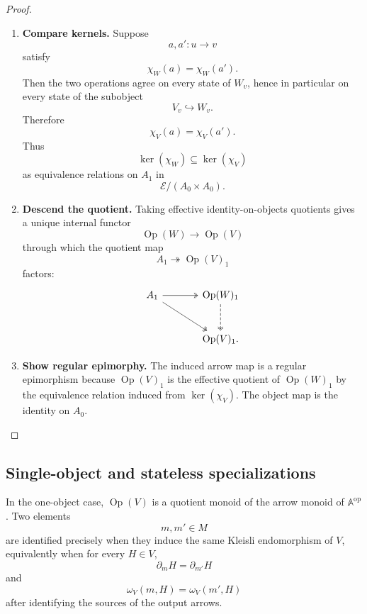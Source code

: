 \begin{proof}
    \leavevmode
    \begin{enumerate}
        \item \textbf{Compare kernels.}
        Suppose
        \[
            a,a':u\to v
        \]
        satisfy
        \[
            \chi_W(a)=\chi_W(a').
        \]
        Then the two operations agree on every state of \(W_v\), hence in
        particular on every state of the subobject
        \[
            V_v\hookrightarrow W_v.
        \]
        Therefore
        \[
            \chi_V(a)=\chi_V(a').
        \]
        Thus
        \[
            \ker(\chi_W)\subseteq \ker(\chi_V)
        \]
        as equivalence relations on \(A_1\) in
        \[
            \mathcal E/(A_0\times A_0).
        \]

        \item \textbf{Descend the quotient.}
        Taking effective identity-on-objects quotients gives a unique internal
        functor
        \[
            \operatorname{Op}(W)\to \operatorname{Op}(V)
        \]
        through which the quotient map
        \[
            A_1\twoheadrightarrow \operatorname{Op}(V)_1
        \]
        factors:
        \[
        \begin{tikzcd}[column sep=large, row sep=large]
            A_1
                \arrow[r, two heads]
                \arrow[dr, two heads]
            &
            \operatorname{Op}(W)_1
                \arrow[d, dashed, two heads]
            \\
            &
            \operatorname{Op}(V)_1 .
        \end{tikzcd}
        \]

        \item \textbf{Show regular epimorphy.}
        The induced arrow map is a regular epimorphism because
        \(\operatorname{Op}(V)_1\) is the effective quotient of
        \(\operatorname{Op}(W)_1\) by the equivalence relation induced from
        \(\ker(\chi_V)\). The object map is the identity on \(A_0\).
    \end{enumerate}
\end{proof}

\subsection{Single-object and stateless specializations}
\label{subsec:operation-single-object-stateless}

In the one-object case, \(\operatorname{Op}(V)\) is a quotient monoid of the
arrow monoid of \(\mathbb A^{\mathrm{op}}\). Two elements
\[
    m,m'\in M
\]
are identified precisely when they induce the same Kleisli endomorphism of
\(V\), equivalently when for every \(H\in V\),
\[
    \partial_mH=\partial_{m'}H
\]
and
\[
    \omega_V(m,H)=\omega_V(m',H)
\]
after identifying the sources of the output arrows.

